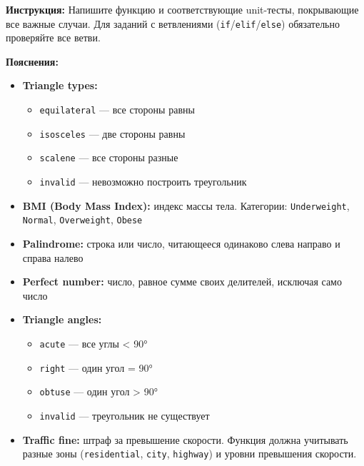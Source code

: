 

\textbf{Инструкция:} Напишите функцию и соответствующие unit-тесты, покрывающие все важные случаи. Для заданий с ветвлениями (\texttt{if}/\texttt{elif}/\texttt{else}) обязательно проверяйте все ветви.  

\textbf{Пояснения:}  
\begin{itemize}
    \item \textbf{Triangle types:} 
        \begin{itemize}
            \item \texttt{equilateral} — все стороны равны  
            \item \texttt{isosceles} — две стороны равны  
            \item \texttt{scalene} — все стороны разные  
            \item \texttt{invalid} — невозможно построить треугольник  
        \end{itemize}
    \item \textbf{BMI (Body Mass Index):} индекс массы тела. Категории: \texttt{Underweight}, \texttt{Normal}, \texttt{Overweight}, \texttt{Obese}  
    \item \textbf{Palindrome:} строка или число, читающееся одинаково слева направо и справа налево  
    \item \textbf{Perfect number:} число, равное сумме своих делителей, исключая само число  
    \item \textbf{Triangle angles:} 
        \begin{itemize}
            \item \texttt{acute} — все углы < 90°  
            \item \texttt{right} — один угол = 90°  
            \item \texttt{obtuse} — один угол > 90°  
            \item \texttt{invalid} — треугольник не существует  
        \end{itemize}
    \item \textbf{Traffic fine:} штраф за превышение скорости. Функция должна учитывать разные зоны (\texttt{residential}, \texttt{city}, \texttt{highway}) и уровни превышения скорости.
\end{itemize}

